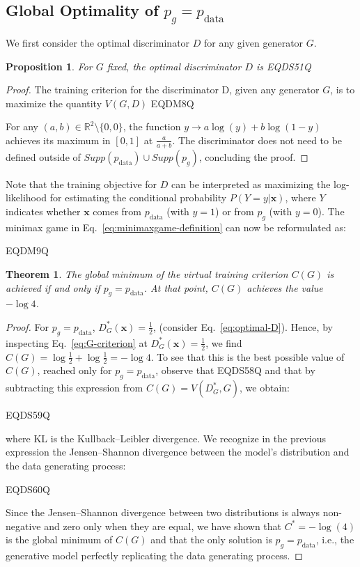 \documentclass{article}
\newtheorem{proposition}{Proposition}
\newtheorem{theorem}{Theorem}
\begin{document}
\subsection{Global Optimality of $p_g=p_\text{data}$}
\label{sec:global-optimality}

We first consider the optimal discriminator $D$ for any given generator $G$.

\begin{proposition}
For $G$ fixed, the optimal discriminator $D$ is
EQDS51Q
\end{proposition}

\begin{proof}
The training criterion for the discriminator D, given any generator $G$, is to maximize the quantity $V(G, D)$
EQDM8Q

For any $(a,b) \in \mathbb{R}^2 \setminus \{0, 0\} $, the function $y \rightarrow a \log (y) + b \log (1-y)$ achieves its maximum in $[0,1]$ at $\frac{a}{a+b}$. The discriminator does not need to be defined outside of $Supp(p_\text{data}) \cup Supp(p_g)$, concluding the proof.
\end{proof}

Note that the training objective for $D$ can be interpreted as maximizing the log-likelihood for estimating the conditional probability $P(Y=y|\bm{x})$, where $Y$ indicates whether $\bm{x}$ comes from $p_\text{data}$ (with $y=1$) or from $p_g$ (with $y=0$). The minimax game in Eq.~\ref{eq:minimaxgame-definition} can now be reformulated as:

EQDM9Q

\begin{theorem}
\label{thm:global-optimality}
The global minimum of the virtual training criterion $C(G)$ is achieved if and only if $p_g=p_\text{data}$.
At that point, $C(G)$ achieves the value $-\log 4$.
\end{theorem}

\begin{proof}
For $p_g=p_\text{data}$, $D^*_G(\bm{x})=\frac{1}{2}$, (consider Eq.~\ref{eq:optimal-D}). Hence, by inspecting Eq.~\ref{eq:G-criterion} at $D^*_G(\bm{x})=\frac{1}{2}$, we find $C(G)=\log\frac{1}{2} + \log\frac{1}{2}= - \log 4$. To see that this is the best possible value of $C(G)$, reached only for $p_g = p_\text{data}$, observe that
EQDS58Q
and that by subtracting this expression from $C(G) = V(D_G^*,G)$, we obtain:

EQDS59Q

where KL is the Kullback--Leibler divergence. We recognize in the previous expression the Jensen--Shannon divergence between the model's distribution and the data generating process:

EQDS60Q

Since the Jensen--Shannon divergence between two distributions is always non-negative and zero only
when they are equal, we have shown that $ C^* = - \log (4)$ is the global minimum of $C(G)$ and
that the only solution is $p_g=p_\text{data}$, i.e., the generative model perfectly replicating the data generating process.
\end{proof}
\end{document}
